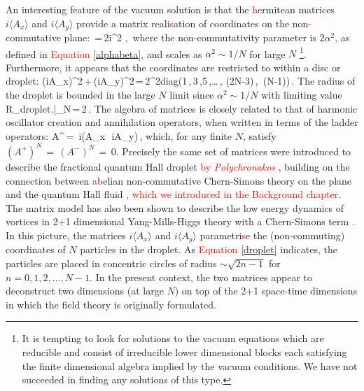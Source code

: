 An interesting feature of the vacuum solution is that the \textcolor{red}{h}ermitean matrices $i\langle A_x\rangle$ and $i\langle A_y\rangle$ provide a matrix reali\textcolor{red}{s}ation of coordinates on the non\textcolor{red}{-}commutative plane:
\be
{}\,=\,2i\alpha^2 \textcolor{red}{,}\,
\ee
where the non\textcolor{red}{-}commutativity parameter is $2\alpha^2$\textcolor{red}{,} as defined in \textcolor{red}{Equation} \eqref{alphabeta}, and scales as $\alpha^2\sim 1/N$ for large $N$
\footnote{ It is tempting to look for solutions to the vacuum equations which are reducible and consist of irreducible lower dimensional blocks each satisfying the finite dimensional algebra  implied by the vacuum conditions.   We have not succeeded in finding any solutions of this type.}. Furthermore, it appears that the coordinates are restricted to within a disc or droplet: 
\be
\left(i\langle A_x\rangle\right)^2\,+\,\left(i\langle A_y\rangle\right)^2\,=\,2\alpha^2{\rm diag}\left(1\,,\,3\,,5\,,\ldots\,, (2N-3)\,,\, (N-1)\right)\,.\label{droplet}
\ee
The radius of the droplet is bounded in the large $N$ limit since $\alpha^2 \sim 1/N$ with limiting value
\be
R_{\rm droplet}\left.\right|_{N\to\infty}\,=\,2\beta{}\,.
\ee
The algebra of matrices is closely related to that of harmonic oscillator creation and annihilation operators, when written in terms of the ladder operators:
\be
A^\pm\,=\, i\left(\langle A_x\rangle \,\pm\, i\langle A_y\rangle\right)\,,
\ee
which, for any finite $N$, satisfy $(A^+)^N\,=\,(A^-)^N\,=\,0$.
Precisely the same set of matrices were introduced to describe the fractional quantum Hall droplet \textcolor{red}{by \textit{Polychronakos}} \cite{Polychronakos:2001mi}, building on the connection between \textcolor{red}{a}belian non\textcolor{red}{-}commutative Chern-Simons theory on the plane and the quantum Hall fluid \cite{Susskind:2001fb}\textcolor{red}{, which we introduced in the Background chapter}. The matrix model has also been shown to describe the low energy dynamics of vortices in 2+1 dimensional Yang-Mills-Higgs theory with a Chern-Simons term \cite{Tong:2003vy, Tong:2015xaa}.
In this picture, the matrices $i\langle A_x \rangle$ and $i\langle A_y\rangle $ parametri\textcolor{red}{s}e the (non\textcolor{red}{-}commuting) coordinates of $N$ particles in the droplet.  As \textcolor{red}{Equation} \eqref{droplet} indicates, the particles are placed in concentric circles of radius $\sim \sqrt{2n-1}$ for $n=0,1,2,\ldots, N-1$. In the present context, the two matrices appear to deconstruct two dimensions (at large $N$) on top of the 2+1 space\textcolor{red}{-}time dimensions in which the field theory is originally formulated. 

